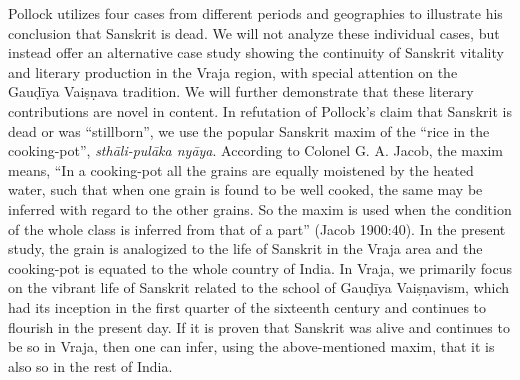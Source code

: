Pollock utilizes four cases from different periods and geographies to illustrate his conclusion that Sanskrit is dead. We will not analyze these individual cases, but instead offer an alternative case study showing the continuity of Sanskrit vitality and literary production in the Vraja region, with special attention on the Gauḍīya Vaiṣṇava tradition. We will further demonstrate that these literary contributions are novel in content. In refutation of Pollock’s claim that Sanskrit is dead or was “stillborn”, we use the popular Sanskrit maxim of the “rice in the cooking-pot”, {\sl sthāli-pulāka nyāya}. According to Colonel G. A. Jacob, the maxim means, “In a cooking-pot all the grains are equally moistened by the heated water, such that when one grain is found to be well cooked, the same may be inferred with regard to the other grains. So the maxim is used when the condition of the whole class is inferred from that of a part” (Jacob 1900:40). In the present study, the grain is analogized to the life of Sanskrit in the Vraja area and the cooking-pot is equated to the whole country of India. In Vraja, we primarily focus on the vibrant life of Sanskrit related to the school of Gauḍīya Vaiṣṇavism, which had its inception in the first quarter of the sixteenth century and continues to flourish in the present day. If it is proven that Sanskrit was alive and continues to be so in Vraja, then one can infer, using the above-mentioned maxim, that it is also so in the rest of India. 

